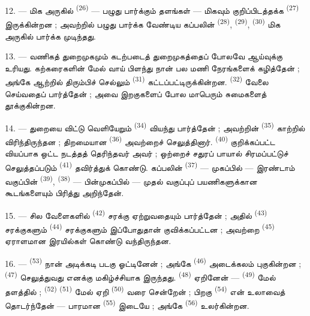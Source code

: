 12. --- மிக அருகில் 
\textsuperscript{(26)} — பழுது பார்க்கும் தளங்கள் — மிகவும்
குறிப்பிடத்தக்க  \textsuperscript{(27)}
இருக்கின்றன ; அவற்றில் பழுது பார்க்க வேண்டிய கப்பலின்  \textsuperscript{(28)}, 
\textsuperscript{(29)},  \textsuperscript{(30)}
மிக அருகில் பார்க்க முடிந்தது.

13. --- வணிகத் துறைமுகமும் கடற்படைத் துறைமுகத்தைப் போலவே
ஆய்வுக்கு உரியது. கற்கரைகளின் மேல் வாய் பிளந்து நான் பல மணி
நேரங்களைக் கழித்தேன் ; அங்கே ஆற்றில் திரும்பிச் செல்லும்
 \textsuperscript{(31)} கட்டப்பட்டிருக்கின்றன.
 \textsuperscript{(32)}
வேலை செய்வதைப் பார்த்தேன் ; அவை இறகுகளைப் போல மாபெரும் சுமைகளைத்
தூக்குகின்றன.

\VUsaut{4.0mm}
\VUsaut{3.0mm}

14. --- துறையை விட்டு வெளியேறும்  \textsuperscript{(34)} வியந்து பார்த்தேன் ; அவற்றின்
 \textsuperscript{(35)} காற்றில் விரிந்திருந்தன ;
திறமையான  \textsuperscript{(36)} அவற்றைச்
செலுத்தினார்.  \textsuperscript{(40)}
 குறிக்கப்பட்ட 
வியப்பாக ஒட்ட நடத்தத் தெரிந்தவர் அவர் ; ஒற்றைச் சதுரப் பாயால்
சிரமப்பட்டுச் செலுத்தப்படும் 
\textsuperscript{(41)} தவிர்த்துக் கொண்டு. கப்பலின்
 \textsuperscript{(37)} — முகப்பில் — இரண்டாம்
வகுப்பின்  \textsuperscript{(39)},  \textsuperscript{(38)} — பின்முகப்பில் — முதல் வகுப்புப்
பயணிகளுக்கான கூடங்களையும் பிரித்து அறிந்தேன்.

15. --- சில வேளைகளில்  \textsuperscript{(42)}
சரக்கு ஏற்றுவதையும் பார்த்தேன் ; அதில் 
\textsuperscript{(43)} சரக்குகளும் 
\textsuperscript{(44)} சரக்குகளும் இப்போதுதான் குவிக்கப்பட்டன ;
அவற்றை  \textsuperscript{(45)} ஏராளமான
இரயில்கள் கொண்டு வந்திருந்தன.

\VUsaut{3.0mm}
\VUsaut{3.0mm}

16. ---  \textsuperscript{(53)} நான் அடிக்கடி
படகு ஓட்டினேன் ; அங்கே  \textsuperscript{(46)}
அடைக்கலம் புகுகின்றன ;  \textsuperscript{(47)}
செலுத்துவது எனக்கு மகிழ்ச்சியாக இருந்தது.  \textsuperscript{(48)}
ஏறினேன் —  \textsuperscript{(49)} மேல்
தளத்தில் ;  \textsuperscript{(52)}
 \textsuperscript{(51)} மேல் ஏறி  \textsuperscript{(50)} வரை சென்றேன் ; பிறகு  \textsuperscript{(54)} என் உலாவைத் தொடர்ந்தேன் — பாரமான
 \textsuperscript{(55)} இடையே ; அங்கே
 \textsuperscript{(56)} உலர்கின்றன.

